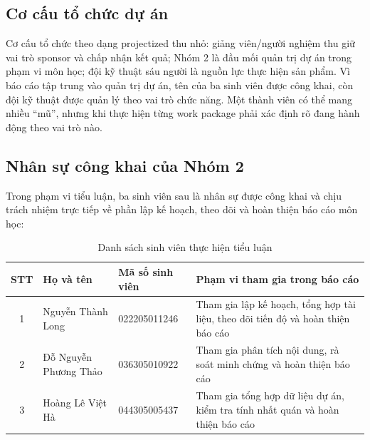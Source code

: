 \subsection{Cơ cấu tổ chức dự án}

Cơ cấu tổ chức theo dạng projectized thu nhỏ: giảng viên/người nghiệm thu giữ vai trò sponsor và chấp nhận kết quả; Nhóm 2 là đầu mối quản trị dự án trong phạm vi môn học; đội kỹ thuật sáu người là nguồn lực thực hiện sản phẩm. Vì báo cáo tập trung vào quản trị dự án, tên của ba sinh viên được công khai, còn đội kỹ thuật được quản lý theo vai trò chức năng. Một thành viên có thể mang nhiều ``mũ'', nhưng khi thực hiện từng work package phải xác định rõ đang hành động theo vai trò nào.


\subsection{Nhân sự công khai của Nhóm 2}

Trong phạm vi tiểu luận, ba sinh viên sau là nhân sự được công khai và chịu trách nhiệm trực tiếp về phần lập kế hoạch, theo dõi và hoàn thiện báo cáo môn học:

\begin{table}[H]
\centering
\caption{Danh sách sinh viên thực hiện tiểu luận}
\label{tab:student-team}
\begin{tabularx}{\textwidth}{| c | X | p{4cm} | X |}
\hline
\textbf{STT} & \textbf{Họ và tên} & \textbf{Mã số sinh viên} & \textbf{Phạm vi tham gia trong báo cáo} \\
\hline
1 & Nguyễn Thành Long & 022205011246 & Tham gia lập kế hoạch, tổng hợp tài liệu, theo dõi tiến độ và hoàn thiện báo cáo \\ \hline
2 & Đỗ Nguyễn Phương Thảo & 036305010922 & Tham gia phân tích nội dung, rà soát minh chứng và hoàn thiện báo cáo \\ \hline
3 & Hoàng Lê Việt Hà & 044305005437 & Tham gia tổng hợp dữ liệu dự án, kiểm tra tính nhất quán và hoàn thiện báo cáo \\
\hline
\end{tabularx}
\end{table}

